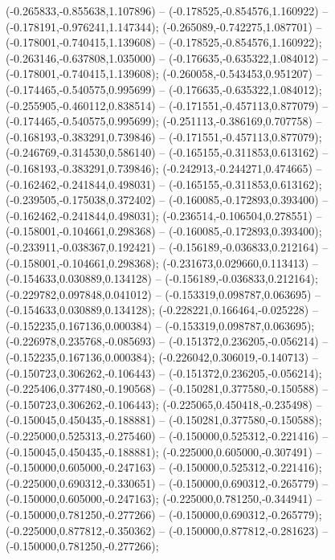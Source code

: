  (-0.265833,-0.855638,1.107896) -- (-0.178525,-0.854576,1.160922) -- (-0.178191,-0.976241,1.147344);
 (-0.265089,-0.742275,1.087701) -- (-0.178001,-0.740415,1.139608) -- (-0.178525,-0.854576,1.160922);
 (-0.263146,-0.637808,1.035000) -- (-0.176635,-0.635322,1.084012) -- (-0.178001,-0.740415,1.139608);
 (-0.260058,-0.543453,0.951207) -- (-0.174465,-0.540575,0.995699) -- (-0.176635,-0.635322,1.084012);
 (-0.255905,-0.460112,0.838514) -- (-0.171551,-0.457113,0.877079) -- (-0.174465,-0.540575,0.995699);
 (-0.251113,-0.386169,0.707758) -- (-0.168193,-0.383291,0.739846) -- (-0.171551,-0.457113,0.877079);
 (-0.246769,-0.314530,0.586140) -- (-0.165155,-0.311853,0.613162) -- (-0.168193,-0.383291,0.739846);
 (-0.242913,-0.244271,0.474665) -- (-0.162462,-0.241844,0.498031) -- (-0.165155,-0.311853,0.613162);
 (-0.239505,-0.175038,0.372402) -- (-0.160085,-0.172893,0.393400) -- (-0.162462,-0.241844,0.498031);
 (-0.236514,-0.106504,0.278551) -- (-0.158001,-0.104661,0.298368) -- (-0.160085,-0.172893,0.393400);
 (-0.233911,-0.038367,0.192421) -- (-0.156189,-0.036833,0.212164) -- (-0.158001,-0.104661,0.298368);
 (-0.231673,0.029660,0.113413) -- (-0.154633,0.030889,0.134128) -- (-0.156189,-0.036833,0.212164);
 (-0.229782,0.097848,0.041012) -- (-0.153319,0.098787,0.063695) -- (-0.154633,0.030889,0.134128);
 (-0.228221,0.166464,-0.025228) -- (-0.152235,0.167136,0.000384) -- (-0.153319,0.098787,0.063695);
 (-0.226978,0.235768,-0.085693) -- (-0.151372,0.236205,-0.056214) -- (-0.152235,0.167136,0.000384);
 (-0.226042,0.306019,-0.140713) -- (-0.150723,0.306262,-0.106443) -- (-0.151372,0.236205,-0.056214);
 (-0.225406,0.377480,-0.190568) -- (-0.150281,0.377580,-0.150588) -- (-0.150723,0.306262,-0.106443);
 (-0.225065,0.450418,-0.235498) -- (-0.150045,0.450435,-0.188881) -- (-0.150281,0.377580,-0.150588);
 (-0.225000,0.525313,-0.275460) -- (-0.150000,0.525312,-0.221416) -- (-0.150045,0.450435,-0.188881);
 (-0.225000,0.605000,-0.307491) -- (-0.150000,0.605000,-0.247163) -- (-0.150000,0.525312,-0.221416);
 (-0.225000,0.690312,-0.330651) -- (-0.150000,0.690312,-0.265779) -- (-0.150000,0.605000,-0.247163);
 (-0.225000,0.781250,-0.344941) -- (-0.150000,0.781250,-0.277266) -- (-0.150000,0.690312,-0.265779);
 (-0.225000,0.877812,-0.350362) -- (-0.150000,0.877812,-0.281623) -- (-0.150000,0.781250,-0.277266);
